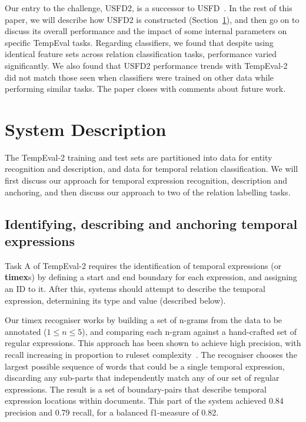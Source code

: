 \documentclass[11pt]{article}
\begin{document}
Our entry to the challenge, USFD2, is a successor to USFD~\cite{hepple2007usfd}. In the rest of this paper, we will describe how USFD2 is constructed (Section~\ref{description}), and then go on to discuss its overall performance and the impact of some internal parameters on specific TempEval tasks. Regarding classifiers, we found that despite using identical feature sets across relation classification tasks, performance varied significantly. We also found that USFD2 performance trends with TempEval-2 did not match those seen when classifiers were trained on other data while performing similar tasks. The paper closes with comments about future work.


\section{System Description}
\label{description}
The TempEval-2 training and test sets are partitioned into data for entity recognition and description, and data for temporal relation classification. We will first discuss our approach for temporal expression recognition, description and anchoring, and then discuss our approach to two of the relation labelling tasks.

\subsection{Identifying, describing and anchoring temporal expressions}
\label{timex}
Task A of TempEval-2 requires the identification of temporal expressions (or {\bf timex}s) by defining a start and end boundary for each expression, and assigning an ID to it. After this, systems should attempt to describe the temporal expression, determining its type and value (described below).

Our timex recogniser works by building a set of n-grams from the data to be annotated ($1 \leq n \leq 5$), and comparing each n-gram against a hand-crafted set of regular expressions. This approach has been shown to achieve high precision, with recall increasing in proportion to ruleset complexity~\cite{han2006language,mani2000robust,ahn2005towards}. The recogniser chooses the largest possible sequence of words that could be a single temporal expression, discarding any sub-parts that independently match any of our set of regular expressions. The result is a set of boundary-pairs that describe temporal expression locations within documents. This part of the system achieved 0.84 precision and 0.79 recall, for a balanced f1-measure of 0.82.
\end{document}
